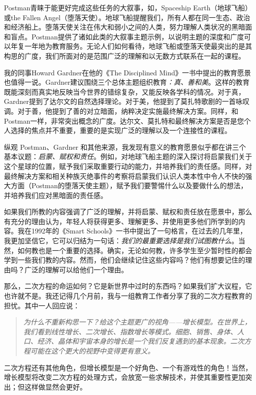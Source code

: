 Postman青睐于能更好完成这些任务的大叙事，如，Spaceship Earth（地球飞船）或the Fallen Angel（堕落天使）。地球飞船提醒我们，所有人都在同一生态、政治和经济船上。堕落天使关注在伟大和弱小之间的人类，努力理解人类状况的黑暗面和盲点。Postman提供了诸如此类的大叙事主题示例，以说明主题的深度和广度可以年复一年地为教育服务。无论人们如何看待，地球飞船或堕落天使最突出的是其构思的广度，我们所面对的是范围广泛的理解和以无数方式联系在一起的课程。

我的同事Howard Gardner在他的《The Disciplined Mind》一书中提出的教育愿景也值得一说。Gardner建议围绕三个总体主题组织教育\textit{：真、善和美}。这样的教育既能深刻而真实地反映当今世界的错综复杂，又能反映各学科的情况。对于真，Gardner提到了达尔文的自然选择理论。对于美，他提到了莫扎特歌剧的一首咏叹调。对于善，他提到了善的对立暗面，纳粹决定实施最终解决方案。同样，和Postman一样，非常突出概念的广度。达尔文、莫扎特和最终解决方案是否是您个人选择的焦点并不重要，重要的是实现广泛的理解以及一个连接性的课程。

纵观 Postman、Gardner 和其他来源，我发现有意义的教育愿景似乎都在讲三个基本议题：\textit{启蒙、赋权和责任}。例如，对地球飞船主题的深入探讨将启蒙我们关于这个星球的位置，赋予我们采取重要行动的能力，并培养我们的责任感。同样，对最终解决方案和相关种族灭绝事件的考察将启蒙我们认识人类本性中令人不快的强大方面（Postman的堕落天使主题），赋予我们要警惕什么以及要做什么的想法，并培养我们应对黑暗面的责任感。

如果我们所教的内容强调了广泛的理解，并将启蒙、赋权和责任放在愿景中，那么有充分的理由认为，年轻人将获得更多、理解更多、并使用更多他们所学到的内容。我在1992年的《Smart Schools》一书中提出了一句格言，在过去的几年里，我更加坚信它，它可以归结为一句话：\textit{我们的最重要选择是我们试图教什么}。当然，如何教也是一个重要的选择。确实，无论如何教，许多学生至少暂时性的都会学到一些我们教的内容。然而，他们会继续记住这些内容吗？他们有想要记住的理由吗？广泛的理解可以给他们一个理由。

那么，二次方程的命运如何？它是新世界中过时的东西吗？如果我们扩大议程，它也许就不是。我还记得几个月前，我与一组教育工作者分享了我的二次方程教育的担忧。其中一人回应说：
\begin{quotation}
    \textit{为什么不重新构思一下？给这个主题更广的视角——增长模型。在世界上，我们看到线性增长、二次增长、指数增长等模式。细胞、销售、身体、人口、经济、晶体和宇宙本身的增长是一个我们反复遇到的基本现象。二次方程可能在这个更大的视野中变得更有意义。}  
\end{quotation}

二次方程还有其他角色，但增长模型是一个好角色、一个有游戏性的角色！当然，增长模型将改变二次方程的处理方式，会放宽一些求解技术，并使其重要性更加突出；但这样做显然会更好。

